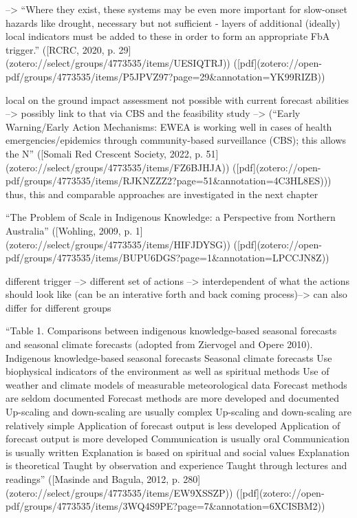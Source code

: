 {-->
“Where they exist, these systems may be even more important for slow-onset hazards like drought, necessary but not sufficient - layers of additional (ideally) local indicators must be added to these in order to form an appropriate FbA trigger.” ([RCRC, 2020, p. 29](zotero://select/groups/4773535/items/UESIQTRJ)) ([pdf](zotero://open-pdf/groups/4773535/items/P5JPVZ97?page=29&annotation=YK99RIZB))


local on the ground impact assessment not possible with current forecast abilities --> possibly link to that via CBS and the feasibility study --> (“Early Warning/Early Action Mechanisms: EWEA is working well in cases of health emergencies/epidemics through community-based surveillance (CBS); this allows the N” ([Somali Red Crescent Society, 2022, p. 51](zotero://select/groups/4773535/items/FZ6BJHJA)) ([pdf](zotero://open-pdf/groups/4773535/items/RJKNZZZ2?page=51&annotation=4C3HL8ES))) 
thus, this and comparable approaches are investigated in the next chapter

“The Problem of Scale in Indigenous Knowledge: a Perspective from Northern Australia” ([Wohling, 2009, p. 1](zotero://select/groups/4773535/items/HIFJDYSG)) ([pdf](zotero://open-pdf/groups/4773535/items/BUPU6DGS?page=1&annotation=LPCCJN8Z))

different trigger --> different set of actions --> interdependent of what the actions should look like (can be an interative forth and back coming process)--> can also differ for different groups

“Table 1. Comparisons between indigenous knowledge-based seasonal forecasts and seasonal climate forecasts (adopted from Ziervogel and Opere 2010). Indigenous knowledge-based seasonal forecasts Seasonal climate forecasts Use biophysical indicators of the environment as well as spiritual methods Use of weather and climate models of measurable meteorological data Forecast methods are seldom documented Forecast methods are more developed and documented Up-scaling and down-scaling are usually complex Up-scaling and down-scaling are relatively simple Application of forecast output is less developed Application of forecast output is more developed Communication is usually oral Communication is usually written Explanation is based on spiritual and social values Explanation is theoretical Taught by observation and experience Taught through lectures and readings” ([Masinde and Bagula, 2012, p. 280](zotero://select/groups/4773535/items/EW9XSSZP)) ([pdf](zotero://open-pdf/groups/4773535/items/3WQ4S9PE?page=7&annotation=6XCISBM2))

}

